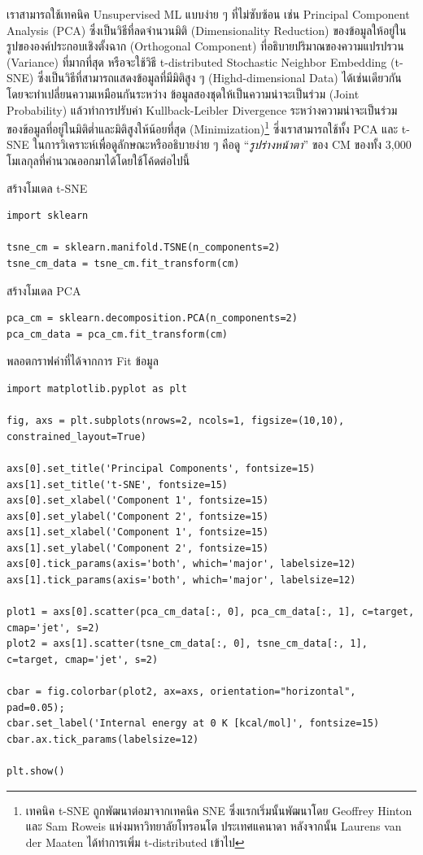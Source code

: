 เราสามารถใช้เทคนิค Unsupervised ML แบบง่าย ๆ ที่ไม่ซับซ้อน เช่น Principal Component Analysis (PCA) ซึ่งเป็นวิธีที่ลดจำนวนมิติ 
(Dimensionality Reduction) ของข้อมูลให้อยู่ในรูปขององค์ประกอบเชิงตั้งฉาก (Orthogonal Component) ที่อธิบายปริมาณของความแปรปรวน
(Variance) ที่มากที่สุด หรือจะใช้วิธี t-distributed Stochastic Neighbor Embedding (t-SNE) ซึ่งเป็นวิธีที่สามารถแสดงข้อมูลที่มีมิติสูง ๆ 
(Highd-dimensional Data) ได้เช่นเดียวกัน\autocite{JMLR:v9:vandermaaten08a,belkina2019} โดยจะทำเปลี่ยนความเหมือนกันระหว่าง%
ข้อมูลสองชุดให้เป็นความน่าจะเป็นร่วม (Joint Probability) แล้วทำการปรับค่า Kullback-Leibler Divergence ระหว่างความน่าจะเป็นร่วม%
ของข้อมูลที่อยู่ในมิติต่ำและมิติสูงให้น้อยที่สุด (Minimization)\footnote{เทคนิค t-SNE ถูกพัฒนาต่อมาจากเทคนิค SNE ซึ่งแรกเริ่มนั้นพัฒนาโดย
Geoffrey Hinton และ Sam Roweis แห่งมหาวิทยาลัยโทรอนโต ประเทศแคนาดา\autocite{NIPS2002_6150ccc6} หลังจากนั้น Laurens 
van der Maaten ได้ทำการเพิ่ม t-distributed เข้าไป} ซึ่งเราสามารถใช้ทั้ง PCA และ t-SNE ในการวิเคราะห์เพื่อดูลักษณะหรืออธิบายง่าย ๆ 
คือดู \enquote{\textit{รูปร่างหน้าตา}} ของ CM ของทั้ง 3,000 โมเลกุลที่คำนวณออกมาได้โดยใช้โค้ดต่อไปนี้

\noindent สร้างโมเดล t-SNE
\begin{lstlisting}[style=MyPython]
import sklearn

tsne_cm = sklearn.manifold.TSNE(n_components=2)
tsne_cm_data = tsne_cm.fit_transform(cm)
\end{lstlisting}

\noindent สร้างโมเดล PCA
\begin{lstlisting}[style=MyPython]
pca_cm = sklearn.decomposition.PCA(n_components=2)
pca_cm_data = pca_cm.fit_transform(cm)
\end{lstlisting}

\noindent พลอตกราฟค่าที่ได้จากการ Fit ข้อมูล
\begin{lstlisting}[style=MyPython]
import matplotlib.pyplot as plt

fig, axs = plt.subplots(nrows=2, ncols=1, figsize=(10,10), constrained_layout=True)

axs[0].set_title('Principal Components', fontsize=15)
axs[1].set_title('t-SNE', fontsize=15)
axs[0].set_xlabel('Component 1', fontsize=15)
axs[0].set_ylabel('Component 2', fontsize=15)
axs[1].set_xlabel('Component 1', fontsize=15)
axs[1].set_ylabel('Component 2', fontsize=15)
axs[0].tick_params(axis='both', which='major', labelsize=12)
axs[1].tick_params(axis='both', which='major', labelsize=12)

plot1 = axs[0].scatter(pca_cm_data[:, 0], pca_cm_data[:, 1], c=target, cmap='jet', s=2)
plot2 = axs[1].scatter(tsne_cm_data[:, 0], tsne_cm_data[:, 1], c=target, cmap='jet', s=2)

cbar = fig.colorbar(plot2, ax=axs, orientation="horizontal", pad=0.05);
cbar.set_label('Internal energy at 0 K [kcal/mol]', fontsize=15)
cbar.ax.tick_params(labelsize=12)

plt.show()
\end{lstlisting}

